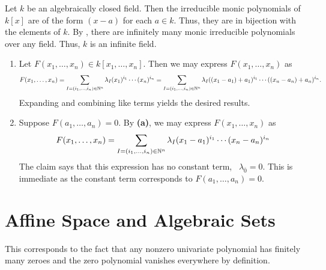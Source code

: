\documentclass[letterpaper, 11pt, oneside]{book}
\begin{document}
\clearpage

\begin{sol}\label{ex:Curves_1.6}
  Let $k$ be an algebraically closed field.
  Then the irreducible monic polynomials of $k[x]$ are of the form $(x - a)$ for each $a \in k$.
  Thus, they are in bijection with the elements of $k$.
  By \mbox{}, there are infinitely many monic irreducible polynomials over any field.
  Thus, $k$ is an infinite field.
\end{sol}

\begin{sol}\label{ex:Curves_1.7}
  \begin{enumerate}[label= (\alph*)]
    \item Let $F(x_{1}, \ldots, x_{n}) \in k[x_{1}, \ldots, x_{n}]$.
          Then we may express $F(x_{1}, \ldots, x_{n})$ as
          \[
            F(x_{1}, \ldots, x_{n}) = \sum_{I = (i_{1}, \ldots, i_{n}) \in \mathbb{N} ^{n}} \lambda_{I} (x_{1})^{i_{1}} \cdots (x_{n})^{i_{n}} = \sum_{I = (i_{1}, \ldots, i_{n}) \in \mathbb{N} ^{n}} \lambda_{I} ((x_{1} - a_{1}) + a_{1})^{i_{1}} \cdots ((x_{n} - a_{n}) + a_{n})^{i_{n}}.
          \]
          Expanding and combining like terms yields the desired results.
    \item Suppose $F(a_{1}, \ldots, a_{n}) = 0$.
          By \textbf{(a)}, we may express $F(x_{1}, \ldots, x_{n})$ as
          \[
            F(x_{1}, \ldots, x_{n}) = \sum_{I = (i_{1}, \ldots, i_{n}) \in \mathbb{N} ^{n}} \lambda_{I} (x_{1} - a_{1})^{i_{1}} \cdots (x_{n} - a_{n})^{i_{n}}
          \]
          The claim says that this expression has no constant term, \ie\ $\lambda_{\overline{0}} = 0$.
          This is immediate as the constant term corresponds to $F(a_{1}, \ldots, a_{n}) = 0$.
  \end{enumerate}
\end{sol}

\clearpage

\section{Affine Space and Algebraic Sets}

\begin{sol}\label{ex:Curves_1.8}
  This corresponds to the fact that any nonzero univariate polynomial has finitely many zeroes and the zero polynomial vanishes everywhere by definition.
\end{sol}
\end{document}
